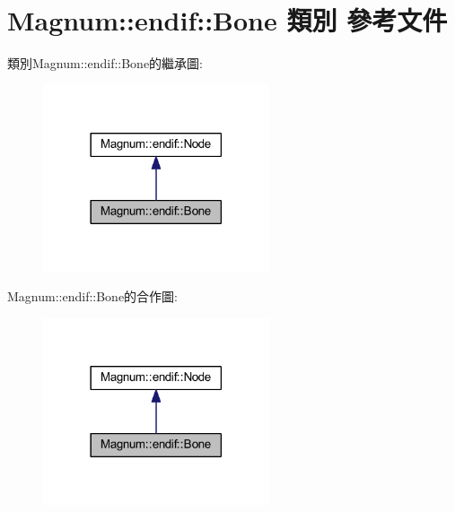 \hypertarget{class_magnum_1_1endif_1_1_bone}{}\section{Magnum\+:\+:endif\+:\+:Bone 類別 參考文件}
\label{class_magnum_1_1endif_1_1_bone}


類別\+Magnum\+:\+:endif\+:\+:Bone的繼承圖\+:\nopagebreak
\begin{figure}[H]
\begin{center}
\leavevmode
\includegraphics[width=189pt]{class_magnum_1_1endif_1_1_bone__inherit__graph}
\end{center}
\end{figure}


Magnum\+:\+:endif\+:\+:Bone的合作圖\+:\nopagebreak
\begin{figure}[H]
\begin{center}
\leavevmode
\includegraphics[width=189pt]{class_magnum_1_1endif_1_1_bone__coll__graph}
\end{center}
\end{figure}
